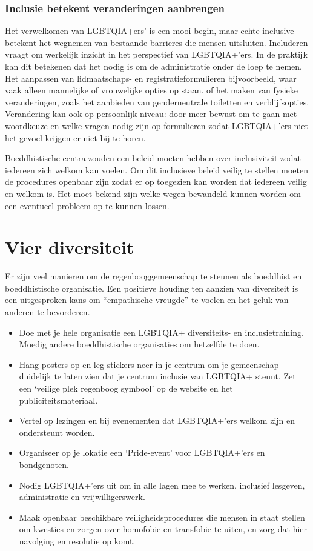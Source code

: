 \documentclass[12pt,openany]{book}
\begin{document}
\subsubsection*{Inclusie betekent veranderingen aanbrengen}

Het verwelkomen van LGBTQIA+ers’ is een mooi begin, maar echte inclusive betekent het wegnemen van bestaande barrieres die mensen uitsluiten. Includeren vraagt om werkelijk inzicht in het perspectief van LGBTQIA+’ers. In de praktijk kan dit betekenen dat het nodig is om de administratie onder de loep te nemen. Het aanpassen van lidmaatschaps- en registratieformulieren bijvoorbeeld, waar vaak alleen mannelijke of vrouwelijke opties op staan. of het maken van fysieke veranderingen, zoals het aanbieden van genderneutrale toiletten en verblijfsopties.  Verandering kan ook op persoonlijk niveau: door meer bewust om te gaan met woordkeuze en welke vragen nodig zijn op formulieren zodat LGBTQIA+’ers niet het gevoel krijgen er niet bij te horen.

Boeddhistische centra zouden een beleid moeten hebben over inclusiviteit zodat iedereen zich welkom kan voelen. Om dit inclusieve beleid veilig te stellen moeten de procedures openbaar zijn zodat er op toegezien kan worden dat iedereen veilig en welkom is. Het moet bekend zijn welke wegen bewandeld kunnen worden om een eventueel probleem op te kunnen lossen.

\section*{Vier diversiteit} 

Er zijn veel manieren om de regenbooggemeenschap te steunen als boeddhist en boeddhistische organisatie. Een positieve houding ten aanzien van diversiteit is een uitgesproken kans om “empathische vreugde” te voelen en het geluk van anderen te bevorderen.

\begin{itemize}
  \item Doe met je hele organisatie een LGBTQIA+ diversiteits- en inclusietraining. Moedig andere boeddhistische organisaties om hetzelfde te doen.
  \item Hang posters op en leg stickers neer in je centrum om je gemeenschap duidelijk te laten zien dat je centrum inclusie van LGBTQIA+ steunt. Zet een ‘veilige plek regenboog symbool’ op de website en het publiciteitsmateriaal.
  \item Vertel op lezingen en bij evenementen dat LGBTQIA+’ers welkom zijn en ondersteunt worden.
  \item Organiseer op je lokatie een ‘Pride-event’ voor LGBTQIA+’ers en bondgenoten.
  \item Nodig LGBTQIA+’ers uit om in alle lagen mee te werken, inclusief lesgeven, administratie en vrijwilligerswerk. \\
  \item Maak openbaar beschikbare veiligheidsprocedures die mensen in staat stellen om kwesties en zorgen over homofobie en transfobie te uiten, en zorg dat hier navolging en resolutie op komt.
\end{itemize}
\end{document}
